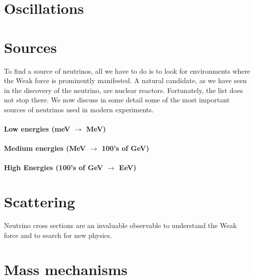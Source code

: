 \graphicspath{{}{theory/}}

\section{Oscillations}

\section{Sources}

To find a source of neutrinos, all we have to do is to look for environments where the Weak force is prominently manifested. A natural candidate, as we have seen in the discovery of the neutrino, are nuclear reactors. Fortunately, the list does not stop there. We now discuss in some detail some of the most important sources of neutrinos used in modern experiments.

\paragraph{Low energies (meV $\to$ MeV)}

\paragraph{Medium energies (MeV $\to$ 100's of GeV)}

\paragraph{High Energies (100's of GeV $\to$ EeV)}


\section{Scattering}

Neutrino cross sections are an invaluable observable to understand the Weak force and to search for new physics. 

\begin{figure}
\end{figure}



\section{Mass mechanisms}

